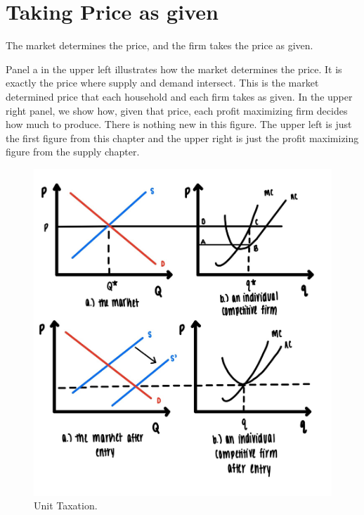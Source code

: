 \documentclass[
]{book}
\begin{document}
\hypertarget{taking-price-as-given}{%
\section{Taking Price as given}\label{taking-price-as-given}}

The market determines the price, and the firm takes the price as given.

Panel a in the upper left illustrates how the market determines the price. It is exactly the price where supply and demand intersect. This is the market determined price that each household and each firm takes as given. In the upper right panel, we show how, given that price, each profit maximizing firm decides how much to produce. There is nothing new in this figure. The upper left is just the first figure from this chapter and the upper right is just the profit maximizing figure from the supply chapter.

\begin{figure}

{\centering \includegraphics[width=1\linewidth]{img/ch5/fig10} 

}

\caption{Unit Taxation.}\label{fig:fig510}
\end{figure}
\end{document}
